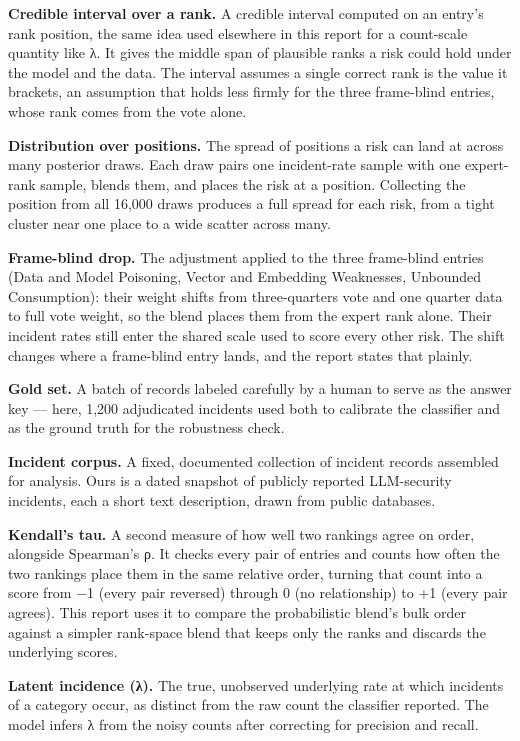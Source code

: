 \documentclass[11pt]{article}
\begin{document}
\textbf{Credible interval over a rank.} A credible interval computed on
an entry's rank position, the same idea used elsewhere in this report
for a count-scale quantity like λ. It gives the middle span of plausible
ranks a risk could hold under the model and the data. The interval
assumes a single correct rank is the value it brackets, an assumption
that holds less firmly for the three frame-blind entries, whose rank
comes from the vote alone.

\textbf{Distribution over positions.} The spread of positions a risk can
land at across many posterior draws. Each draw pairs one incident-rate
sample with one expert-rank sample, blends them, and places the risk at
a position. Collecting the position from all 16,000 draws produces a
full spread for each risk, from a tight cluster near one place to a wide
scatter across many.

\textbf{Frame-blind drop.} The adjustment applied to the three
frame-blind entries (Data and Model Poisoning, Vector and Embedding
Weaknesses, Unbounded Consumption): their weight shifts from
three-quarters vote and one quarter data to full vote weight, so the
blend places them from the expert rank alone. Their incident rates still
enter the shared scale used to score every other risk. The shift changes
where a frame-blind entry lands, and the report states that plainly.

\textbf{Gold set.} A batch of records labeled carefully by a human to
serve as the answer key --- here, 1,200 adjudicated incidents used both
to calibrate the classifier and as the ground truth for the robustness
check.

\textbf{Incident corpus.} A fixed, documented collection of incident
records assembled for analysis. Ours is a dated snapshot of publicly
reported LLM-security incidents, each a short text description, drawn
from public databases.

\textbf{Kendall's tau.} A second measure of how well two rankings agree
on order, alongside Spearman's ρ. It checks every pair of entries and
counts how often the two rankings place them in the same relative order,
turning that count into a score from −1 (every pair reversed) through 0
(no relationship) to +1 (every pair agrees). This report uses it to
compare the probabilistic blend's bulk order against a simpler
rank-space blend that keeps only the ranks and discards the underlying
scores.

\textbf{Latent incidence (λ).} The true, unobserved underlying rate at
which incidents of a category occur, as distinct from the raw count the
classifier reported. The model infers λ from the noisy counts after
correcting for precision and recall.
\end{document}
